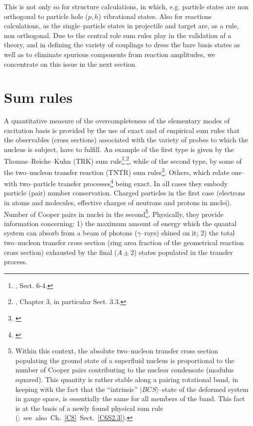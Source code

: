 This is not only so for structure calculations, in which, e.g. particle states are non orthogonal to particle hole ($p,h$) vibrational states. Also for reactions calculations, as the single--particle states in projectile and target are, as a rule, non orthogonal. Due to the central role sum rules play in the validation af a theory, and in defining the variety of couplings to dress the bare basis states as well as to eliminate spurious components from reaction amplitudes, we concentrate on this issue in the next section.





\section{Sum rules}\label{C1S2}
A quantitative measure of the overcompleteness of  the elementary modes of excitation basis is provided by the use of exact and of empirical sum rules that the observables (cross sections) associated with the variety of probes to which the nucleus is subject, have to fulfill. An example of the first type  is given by the Thomas--Reiche--Kuhn (TRK) sum rule\footnote{\cite{Bohr:75}, Sect. 6-4.}$^,$\footnote{\cite{Bertsch:05}, Chapter 3, in particular Sect. 3.3.}, while of the second type, by some of the two--nucleon transfer reaction (TNTR) sum rules\footnote{\cite{Broglia:72b}}. Others, which relate one-- with two--particle transfer processes\footnote{\cite{Bayman:72,Lanford:77}} being exact. In all cases they embody particle (pair) number conservation. Charged particles in the first case (electrons in atoms and molecules, effective charges of neutrons and protons in nuclei). Number of Cooper pairs in nuclei in the second\footnote{Within this context, the absolute two--nucleon transfer cross section populating the ground state of a superfluid nucleus is proportional to the number of Cooper pairs contributing to the nuclear condensate (modulus squared). This quantity is rather stable along a pairing rotational band, in keeping with the fact that the ``intrinsic'' $|BCS\rangle$--state of the deformed system in gauge space, is essentially the same for all members of the band. This fact is at the basis of a newly found physical sum rule \mbox{(\cite{Potel:17}; see also Ch.  \ref{C8} Sect. \ref{C6S2.3})}.}. Physically, they provide  information concerning: 1) the maximum amount of energy which the quantal system can absorb from a beam of photons ($\gamma$--rays) shined on it; 2) the total two--nucleon transfer cross section (ring area fraction of the geometrical reaction cross section) exhausted by the final ($A\pm2$) states populated in the transfer process.







